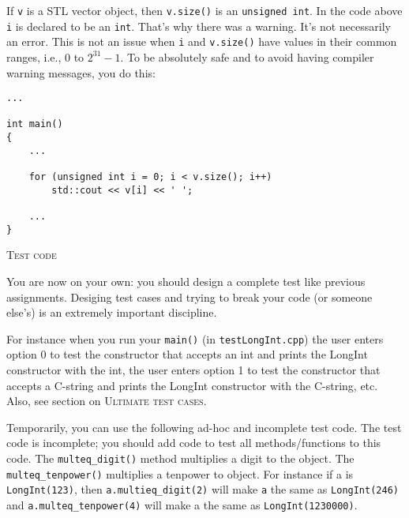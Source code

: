 If \verb!v! is a STL vector object, then \verb!v.size()! is an 
\verb!unsigned int!. In the code above \verb!i! is declared to 
be an \verb!int!. That's why there was a warning. It's not 
necessarily an error. This is not an issue when \verb!i! and 
\verb!v.size()! have values in their common ranges, i.e., 
0 to $2^{31} - 1$. To be absolutely safe and to avoid having compiler 
warning messages, you do this:
\begin{Verbatim}[frame=single,fontsize=\footnotesize]
...

int main()
{
    ...

    for (unsigned int i = 0; i < v.size(); i++)
        std::cout << v[i] << ' ';
    
    ...
}
\end{Verbatim}



\newpage
\textsc{Test code}

You are now on your own:
you should design a complete test like previous assignments.
Desiging test cases and trying to break your code (or someone else's)
is an extremely important discipline.

For instance when you run your \verb!main()! (in \verb!testLongInt.cpp!)
the user enters option 0 to test the constructor that accepts an int
and prints the LongInt constructor with the int,
the user enters option 1 to test the constructor that accepts a
C-string and prints the LongInt constructor with the C-string, etc.
Also, see section on \textsc{Ultimate test cases}.

Temporarily, you can use the following ad-hoc and incomplete test code.
The test code is incomplete; you should add code to test all methods/functions 
to this code. The \verb!multeq_digit()! method multiplies a 
digit to the object. The \verb!multeq_tenpower()! multiplies a 
tenpower to object. For instance if a is \verb!LongInt(123)!, 
then \verb!a.multieq_digit(2)! will make \verb!a! the same as 
\verb!LongInt(246)! and \verb!a.multeq_tenpower(4)! will make 
a the same as \verb!LongInt(1230000)!.

